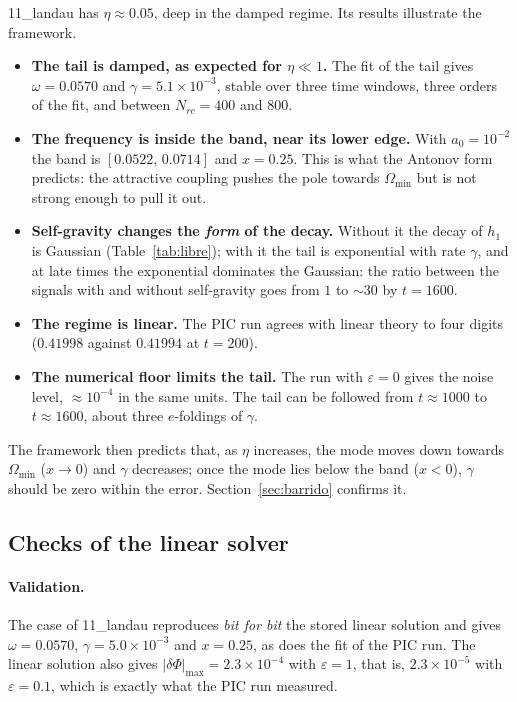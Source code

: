 \documentclass[11pt,a4paper]{article}
\begin{document}
11\_landau has $\eta\approx0.05$, deep in the damped regime. Its results illustrate the
framework.
\begin{itemize}
\item \textbf{The tail is damped, as expected for $\eta\ll1$.} The fit of the tail gives
$\omega = 0.0570$ and $\gamma = 5.1\times10^{-3}$, stable over three time windows, three orders of
the fit, and between $N_{rc}=400$ and $800$.
\item \textbf{The frequency is inside the band, near its lower edge.} With $a_0=10^{-2}$
the band is $[0.0522,\,0.0714]$ and $x=0.25$. This is what the Antonov form predicts: the
attractive coupling pushes the pole towards $\Omega_{\min}$ but is not strong enough to pull it
out.
\item \textbf{Self-gravity changes the \emph{form} of the decay.} Without it the decay of
$h_1$ is Gaussian (Table~\ref{tab:libre}); with it the tail is exponential with rate $\gamma$,
and at late times the exponential dominates the Gaussian: the ratio between the signals
with and without self-gravity goes from $1$ to $\sim30$ by $t=1600$.
\item \textbf{The regime is linear.} The PIC run agrees with linear theory to four
digits ($0.41998$ against $0.41994$ at $t=200$).
\item \textbf{The numerical floor limits the tail.} The run with $\varepsilon=0$ gives the noise
level, $\approx10^{-4}$ in the same units. The tail can be followed from $t\approx1000$ to
$t\approx1600$, about three $e$-foldings of $\gamma$.
\end{itemize}
The framework then predicts that, as $\eta$ increases, the mode moves down towards
$\Omega_{\min}$ ($x\to0$) and $\gamma$ decreases; once the mode lies below the band ($x<0$), $\gamma$ should
be zero within the error. Section~\ref{sec:barrido} confirms it.

\subsection{Checks of the linear solver}
\label{sec:comprobaciones}

\paragraph{Validation.} The case of 11\_landau reproduces \emph{bit for bit} the stored
linear solution and gives $\omega=0.0570$, $\gamma=5.0\times10^{-3}$ and $x=0.25$, as does the fit of
the PIC run. The linear solution also gives $|\delta\Phi|_{\max}=2.3\times10^{-4}$ with $\varepsilon=1$, that is,
$2.3\times10^{-5}$ with $\varepsilon=0.1$, which is exactly what the PIC run measured.
\end{document}
